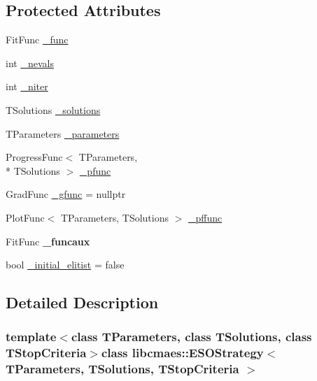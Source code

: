 \subsection*{Protected Attributes}
\begin{DoxyCompactItemize}
\item 
Fit\+Func \hyperlink{classlibcmaes_1_1ESOStrategy_a1a29d4c30bbdb6021920275e81fa4dc4}{\+\_\+func}
\item 
int \hyperlink{classlibcmaes_1_1ESOStrategy_a19667f1e69856e7cfd6219b63cbaa59d}{\+\_\+nevals}
\item 
int \hyperlink{classlibcmaes_1_1ESOStrategy_aaf5c063558da34826ea1f976423ccfbb}{\+\_\+niter}
\item 
T\+Solutions \hyperlink{classlibcmaes_1_1ESOStrategy_a8fe0f8dc2201951e9e4ed2768b5a09ab}{\+\_\+solutions}
\item 
T\+Parameters \hyperlink{classlibcmaes_1_1ESOStrategy_a295e49238ceef8f11b3fb35296a8364a}{\+\_\+parameters}
\item 
Progress\+Func$<$ T\+Parameters, \\*
T\+Solutions $>$ \hyperlink{classlibcmaes_1_1ESOStrategy_a25d597189596f434a2530887fddea189}{\+\_\+pfunc}
\item 
Grad\+Func \hyperlink{classlibcmaes_1_1ESOStrategy_a76926e49a2ca941a22362167bc230093}{\+\_\+gfunc} = nullptr
\item 
Plot\+Func$<$ T\+Parameters, T\+Solutions $>$ \hyperlink{classlibcmaes_1_1ESOStrategy_af2c9909de76f98e4b9c207bda577255d}{\+\_\+pffunc}
\item 
\hypertarget{classlibcmaes_1_1ESOStrategy_a3b59faa95ebae7336607b9b4ebd0c266}{Fit\+Func {\bfseries \+\_\+funcaux}}\label{classlibcmaes_1_1ESOStrategy_a3b59faa95ebae7336607b9b4ebd0c266}

\item 
bool \hyperlink{classlibcmaes_1_1ESOStrategy_a1ee27b35458c52501bebf5bdc42de385}{\+\_\+initial\+\_\+elitist} = false
\end{DoxyCompactItemize}


\subsection{Detailed Description}
\subsubsection*{template$<$class T\+Parameters, class T\+Solutions, class T\+Stop\+Criteria$>$class libcmaes\+::\+E\+S\+O\+Strategy$<$ T\+Parameters, T\+Solutions, T\+Stop\+Criteria $>$}


